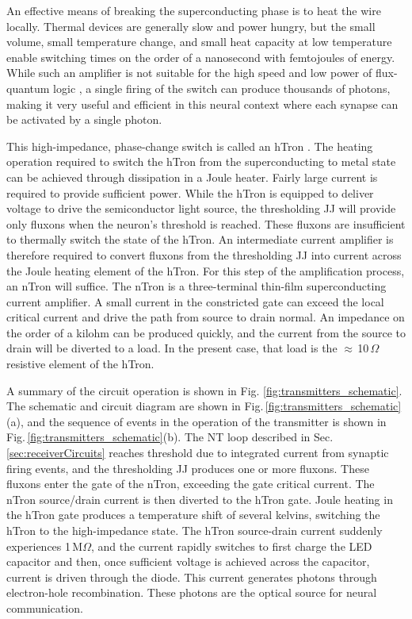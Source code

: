 \documentclass[aip,amsmath,amssymb,reprint,nofootinbib]{revtex4-1}
\begin{document}
An effective means of breaking the superconducting phase is to heat the wire locally. Thermal devices are generally slow and power hungry, but the small volume, small temperature change, and small heat capacity at low temperature \cite{lasa1988,du2015} enable switching times on the order of a nanosecond with femtojoules of energy. While such an amplifier is not suitable for the high speed and low power of flux-quantum logic \cite{hehe2011,mu2011,li2012,taoz2013}, a single firing of the switch can produce thousands of photons, making it very useful and efficient in this neural context where each synapse can be activated by a single photon.

This high-impedance, phase-change switch is called an hTron \cite{zhto2018}. The heating operation required to switch the hTron from the superconducting to metal state can be achieved through dissipation in a Joule heater. Fairly large current is required to provide sufficient power. While the hTron is equipped to deliver voltage to drive the semiconductor light source, the thresholding JJ will provide only fluxons when the neuron's threshold is reached. These fluxons are insufficient to thermally switch the state of the hTron. An intermediate current amplifier is therefore required to convert fluxons from the thresholding JJ into current across the Joule heating element of the hTron. For this step of the amplification process, an nTron \cite{mcbe2014} will suffice. The nTron is a three-terminal thin-film superconducting current amplifier. A small current in the constricted gate can exceed the local critical current and drive the path from source to drain normal. An impedance on the order of a kilohm can be produced quickly, and the current from the source to drain will be diverted to a load. In the present case, that load is the $\approx$\,10\,$\Omega$ resistive element of the hTron. 

A summary of the circuit operation is shown in Fig. \ref{fig:transmitters_schematic}. The schematic and circuit diagram are shown in Fig.\,\ref{fig:transmitters_schematic}(a), and the sequence of events in the operation of the transmitter is shown in Fig.\,\ref{fig:transmitters_schematic}(b). The NT loop described in Sec.\,\ref{sec:receiverCircuits} reaches threshold due to integrated current from synaptic firing events, and the thresholding JJ produces one or more fluxons. These fluxons enter the gate of the nTron, exceeding the gate critical current. The nTron source/drain current is then diverted to the hTron gate. Joule heating in the hTron gate produces a temperature shift of several kelvins, switching the hTron to the high-impedance state. The hTron source-drain current suddenly experiences 1\,M$\Omega$, and the current rapidly switches to first charge the LED capacitor and then, once sufficient voltage is achieved across the capacitor, current is driven through the diode. This current generates photons through electron-hole recombination. These photons are the optical source for neural communication.
\end{document}
